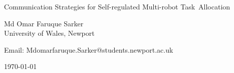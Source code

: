 %
%
%
%

\begin{titlepage}

\begin{center}
\noindent
\huge
Communication Strategies for Self-regulated Multi-robot Task~Allocation
\end{center}

\begin{center}
\noindent
\huge
Md Omar Faruque Sarker\\[10pt]
\large
University of Wales, Newport\\[16pt]
\end{center}

%

\begin{center}
\noindent
Email: Mdomarfaruque.Sarker@students.newport.ac.uk \\
\end{center}

\begin{center}
\noindent
\today
\end{center}

\end{titlepage}

	
